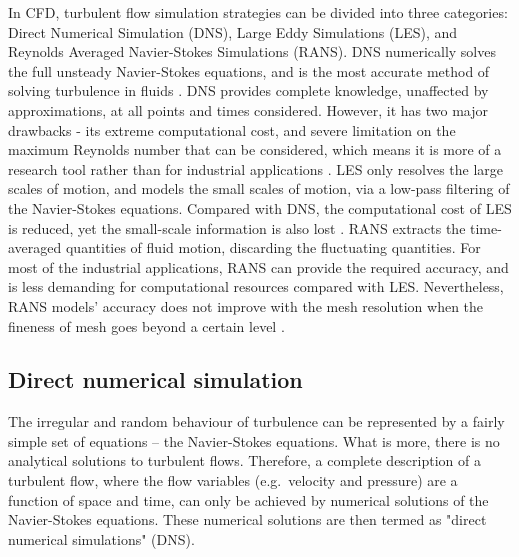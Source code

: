 In CFD, turbulent flow simulation strategies can be divided into three categories: Direct Numerical Simulation (DNS), Large Eddy Simulations (LES), and Reynolds Averaged Navier-Stokes Simulations (RANS). DNS numerically solves the full unsteady Navier-Stokes equations, and is the most accurate method of solving turbulence in fluids \cite{eggenspieler2012,sengupta2008}. DNS provides complete knowledge, unaffected by approximations, at all points and times considered. However, it has two major drawbacks - its extreme computational cost, and severe limitation on the maximum Reynolds number that can be considered, which means it is more of a research tool rather than for industrial applications \cite{coleman2010}. LES only resolves the large scales of motion, and models the small scales of motion, via a low-pass filtering of the Navier-Stokes equations. Compared with DNS, the computational cost of LES is reduced, yet the small-scale information is also lost \cite{largeeddysimulation2015,barcock2014}. RANS extracts the time-averaged quantities of fluid motion, discarding the fluctuating quantities. For most of the industrial applications, RANS can provide the required accuracy, and is less demanding for computational resources compared with LES. Nevertheless, RANS models' accuracy does not improve with the mesh resolution when the fineness of mesh goes beyond a certain level \cite{reynoldsaveragednavierstokesequations2015,eggenspieler2012}. 

\subsection{Direct numerical simulation}

The irregular and random behaviour of turbulence can be represented by a fairly simple set of equations -- the Navier-Stokes equations. What is more, there is no analytical solutions to turbulent flows. Therefore, a complete description of a turbulent flow, where the flow variables (e.g.\ velocity and pressure) are a function of space and time, can only be achieved by numerical solutions of the Navier-Stokes equations. These numerical solutions are then termed as "direct numerical simulations" (DNS). \cite{Moin1998}



